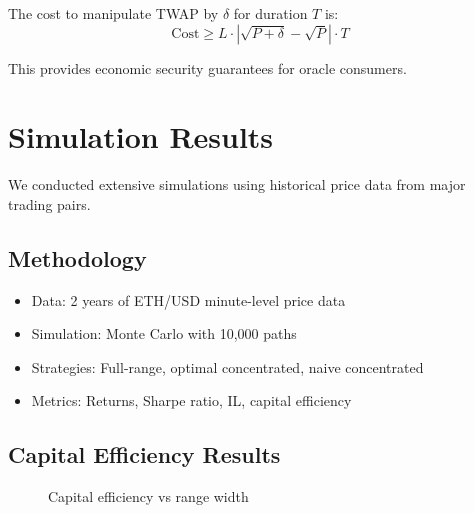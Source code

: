 \documentclass[11pt,a4paper]{article}
\begin{document}
The cost to manipulate TWAP by $\delta$ for duration $T$ is:
\begin{equation}
    \text{Cost} \geq L \cdot |\sqrt{P + \delta} - \sqrt{P}| \cdot T
\end{equation}

This provides economic security guarantees for oracle consumers.

\section{Simulation Results}

We conducted extensive simulations using historical price data from major trading pairs.

\subsection{Methodology}

\begin{itemize}
    \item Data: 2 years of ETH/USD minute-level price data
    \item Simulation: Monte Carlo with 10,000 paths
    \item Strategies: Full-range, optimal concentrated, naive concentrated
    \item Metrics: Returns, Sharpe ratio, IL, capital efficiency
\end{itemize}

\subsection{Capital Efficiency Results}

\begin{figure}[h]
\centering
{}
\caption{Capital efficiency vs range width}
\label{fig:cap_eff}
\end{figure}
\end{document}

